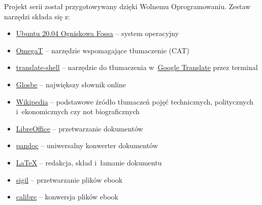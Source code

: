 \documentclass[oneside,polish,11pt,sfheadings]{mwbk}
\begin{document}
Projekt serii został przygotowywany dzięki Wolnemu Oprogramowaniu. Zestaw narzędzi składa się z:
\begin{itemize}
\item \href{https://ubuntu.com/}{Ubuntu 20.04 Ogniskowa Fossa} -- system operacyjny
\item \href{https://omegat.org/}{OmegaT} -- narzędzie wspomagające tłumaczenie (CAT)
\item \href{https://github.com/soimort/translate-shell}{translate-shell} -- narzędzie do tłumaczenia w~\href{https://translate.google.pl}{Google Translate} przez terminal 
\item \href{https://glosbe.com/en/pl}{Glosbe} -- największy słownik online
\item \href{https://www.wikipedia.org/}{Wikipedia} -- podstawowe źródło tłumaczeń pojęć technicznych, politycznych i~ekonomicznych czy not biograficznych
\item \href{https://www.libreoffice.org/}{LibreOffice} -- przetwarzanie dokumentów 
\item \href{http://pandoc.org}{pandoc} -- uniwersalny konwerter dokumentów 
\item \href{https://www.latex-project.org/}{LaTeX} -- redakcja, skład i~łamanie dokumentu
\item \href{https://sigil-ebook.com/}{sigil} -- przetwarzanie plików ebook
\item \href{https://calibre-ebook.com/}{calibre} -- konwersja plików ebook
\end{itemize}




\tableofcontents{}
\end{document}
